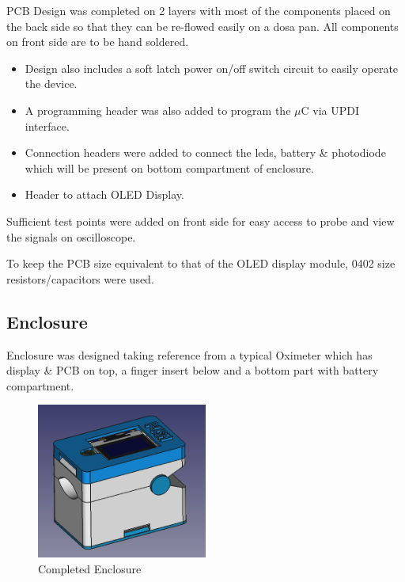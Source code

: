 		PCB Design was completed on 2 layers with most of the components placed on the back side so that they can be re-flowed easily on a dosa pan. All components on front side are to be hand soldered.
		
		\begin{itemize}
			
			\item Design also includes a soft latch power on/off switch circuit to easily operate the device.
			
			\item A programming header was also added to program the $\mu$C via UPDI interface.
			
			\item Connection headers were added to connect the leds, battery \& photodiode which will be present on bottom compartment of enclosure.
			
			\item Header to attach OLED Display.

		\end{itemize}
	
		Sufficient test points were added on front side for easy access to probe and view the signals on oscilloscope.
		
		To keep the PCB size equivalent to that of the OLED display module, 0402 size resistors/capacitors were used.
			

	\subsection{Enclosure}		
		
		Enclosure was designed taking reference from a typical Oximeter which has display \& PCB on top, a finger insert below and a bottom part with battery compartment.
		
		\begin{figure}[ht!]
			\centering
			\includegraphics[width=0.5\textwidth]{../common/enc/enc.png}
			\caption{Completed Enclosure}
		\end{figure}	
		
